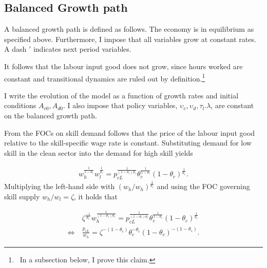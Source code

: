 \subsection{Balanced Growth path}
A balanced growth path  is defined as follows. The economy is in equilibrium as specified above. Furthermore, I impose that all variables grow at constant rates. A dash $'$ indicates next period variables. 

It follows that the labour input good does not grow, since hours worked are constant and transitional dynamics are ruled out by definition.\footnote{\ In a subsection below, I prove this claim.}

I write the evolution of the model as a function of growth rates and initial conditions $A_{c0}, A_{d0}$. I also impose that policy variables, $\upsilon_{c}, \upsilon_{d}, \tau_l. \lambda$, are constant on the balanced growth path. 

From the FOCs on skill demand follows that the price of the labour input good relative to the skill-specific wage rate is constant. Substituting demand for low skill in the clean sector into the demand for high skill yields

\begin{align*}
 w_{h}^{\frac{1}{1-\theta_c}}w_l^{\frac{1}{\theta_c}}= p_{cL}^\frac{1}{(1-\theta_c)\theta_c}\theta_c^\frac{1}{1-\theta_c}(1-\theta_c)^\frac{1}{\theta_c}.
\end{align*}
Multiplying the left-hand side with $(w_h/w_h)^\frac{1}{\theta_c}$ and
using the FOC governing skill supply $w_h/w_l=\zeta$, it holds that

\begin{align}\label{eq:constant}
& \zeta^\frac{-1}{\theta_c}w_h^\frac{1}{(1-\theta_c)\theta_c}= p_{cL}^\frac{1}{(1-\theta_c)\theta_c}\theta_c^\frac{1}{1-\theta_c}(1-\theta_c)^\frac{1}{\theta_c}\nonumber\\
	\Leftrightarrow\ & \frac{p_{cL}}{w_h}= \zeta^{-(1-\theta_c)}\theta_c^{-\theta_c}(1-\theta_c)^{-(1-\theta_c)}.
\end{align}
\noindent {}

